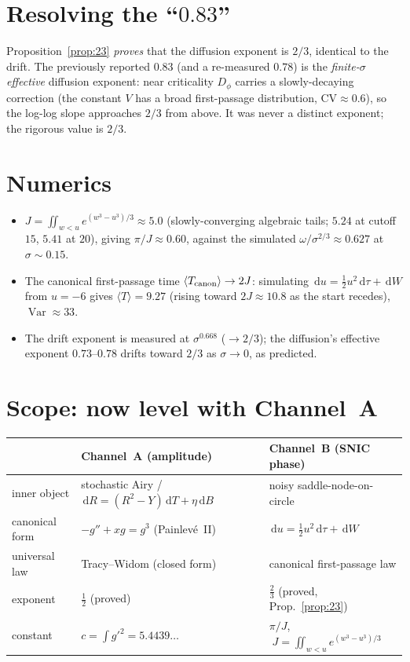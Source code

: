 \documentclass[11pt]{article}
\theoremstyle{remark}
\newcommand{\dd}{\,\mathrm{d}}
\DeclareMathOperator{\Var}{Var}
\begin{document}
\section{Resolving the ``$0.83$''}

Proposition~\ref{prop:23} \emph{proves} that the diffusion exponent is $2/3$, identical to
the drift. The previously reported $0.83$ (and a re-measured $0.78$) is the
\emph{finite-$\sigma$ effective} diffusion exponent: near criticality $D_\phi$ carries a
slowly-decaying correction (the constant $V$ has a broad first-passage distribution,
$\mathrm{CV}\approx0.6$), so the log-log slope approaches $2/3$ from above. It was never a
distinct exponent; the rigorous value is $2/3$.

\section{Numerics}

\begin{itemize}
\item $J=\iint_{w<u}e^{(w^3-u^3)/3}\approx 5.0$ (slowly-converging algebraic tails;
$5.24$ at cutoff $15$, $5.41$ at $20$), giving $\pi/J\approx0.60$, against the simulated
$\omega/\sigma^{2/3}\approx0.627$ at $\sigma\sim0.15$.
\item The canonical first-passage time $\langle T_{\rm canon}\rangle\to2J$: simulating
$\dd u=\tfrac12 u^2\dd\tau+\dd W$ from $u=-6$ gives $\langle T\rangle=9.27$ (rising toward
$2J\approx10.8$ as the start recedes), $\Var\approx33$.
\item The drift exponent is measured at $\sigma^{0.668}$ ($\to2/3$); the diffusion's
effective exponent $0.73$--$0.78$ drifts toward $2/3$ as $\sigma\to0$, as predicted.
\end{itemize}

\section{Scope: now level with Channel~A}

\begin{center}
\begin{tabular}{lll}
\hline
 & Channel~A (amplitude) & Channel~B (SNIC phase) \\
\hline
inner object & stochastic Airy / $\dd R=(R^2-Y)\dd T+\eta\dd B$ & noisy saddle-node-on-circle\\
canonical form & $-g''+xg=g^3$ (Painlev\'e~II) & $\dd u=\tfrac12 u^2\dd\tau+\dd W$\\
universal law & Tracy--Widom (closed form) & canonical first-passage law\\
exponent & $\tfrac12$ (proved) & $\tfrac23$ (proved, Prop.~\ref{prop:23})\\
constant & $c=\int g'^2=5.4439\ldots$ & $\pi/J$, $\;J=\iint_{w<u}e^{(w^3-u^3)/3}$\\
\hline
\end{tabular}
\end{center}
\end{document}
